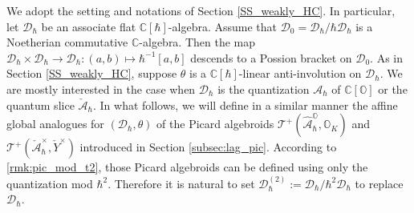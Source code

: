 \documentclass[12pt]{amsart}
\newcommand{\C}{\mathbb{C}}
\newcommand{\A}{\mathcal{A}}
\newcommand{\Orb}{\mathbb{O}}
\newcommand{\TT}{\mathscr{T}}
\newcommand{\per}{\operatorname{Per}}
\newcommand{\cm}{\C^\times}
\newcommand{\wt}{\widetilde}
\newcommand{\Dcal}{\mathcal{D}}
\theoremstyle{definition}
\numberwithin{equation}{section}
\begin{document}

We adopt the setting and notations of Section \ref{SS_weakly_HC}. In particular, let $\Dcal_\hbar$ be an associate flat $\C[\hbar]$-algebra. Assume that $\Dcal_0 = \Dcal_\hbar / \hbar \Dcal_\hbar$ is a Noetherian commutative $\C$-algebra. Then the map $\Dcal_\hbar \times \Dcal_\hbar \to \Dcal_\hbar : (a,b) \mapsto \hbar^{-1}[a,b]$ descends to a Possion bracket on $\Dcal_0$. As in Section \ref{SS_weakly_HC}, suppose $\theta$ is a $\C[\hbar]$-linear anti-involution on $\Dcal_\hbar$. We are mostly interested in the case when $\Dcal_\hbar$ is the quantization $\A_\hbar$ of $\C[\Orb]$ or the quantum slice $\check{\A}_\hbar$. In what follows, we will define  in a similar manner the affine global analogues for $(\Dcal_\hbar, \theta)$ of the Picard algebroids $\TT^+(\hat{\A}_\hbar^\Orb, \Orb_K)$ and $\TT^+(\check{\A}_\hbar^\times, \check{Y}^\times)$ introduced in Section \ref{subsec:lag_pic}. According to \ref{rmk:pic_mod_t2}, those Picard algebroids can be defined using only the quantization mod $\hbar^2$. Therefore it is natural to set $\Dcal_\hbar^{(2)} := \Dcal_\hbar / \hbar^2 \Dcal_\hbar$ to replace $\Dcal_\hbar$.
\end{document}
